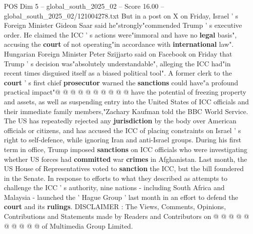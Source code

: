 \begin{textsample}{POS Dim 5 – global\_south\_2025\_02 – Score 16.00 – global\_south\_2025\_02/121004278.txt}
But in a post on X on Friday, Israel ' s Foreign Minister Gideon Saar said he"strongly"commended Trump ' s executive order.
He claimed the ICC ' s actions were"immoral and have no \textbf{legal} basis", accusing the \textbf{court} of not operating"in accordance with \textbf{international} law".
Hungarian Foreign Minister Peter Szijjarto said on Facebook on Friday that Trump ' s decision was"absolutely understandable", alleging the ICC had"in recent times disguised itself as a biased political tool".
A former clerk to the \textbf{court} ' s first chief \textbf{prosecutor} warned the \textbf{sanctions} could have"a profound practical impact"@ @ @ @ @ @ @ @ @ @ have the potential of freezing property and assets, as well as suspending entry into the United States of ICC officials and their immediate family members,"Zachary Kaufman told the BBC World Service.
The US has repeatedly rejected any \textbf{jurisdiction} by the body over American officials or citizens, and has accused the ICC of placing constraints on Israel ' s right to self-defence, while ignoring Iran and anti-Israel groups.
During his first term in office, Trump imposed \textbf{sanctions} on ICC officials who were investigating whether US forces had \textbf{committed} war \textbf{crimes} in Afghanistan.
Last month, the US House of Representatives voted to \textbf{sanction} the ICC, but the bill foundered in the Senate.
In response to efforts to what they described as attempts to challenge the ICC ' s authority, nine nations - including South Africa and Malaysia - launched the ' Hague Group ' last month in an effort to defend the \textbf{court} and its \textbf{rulings}.
DISCLAIMER : The Views, Comments, Opinions, Contributions and Statements made by Readers and Contributors on @ @ @ @ @ @ @ @ @ @ of Multimedia Group Limited.

\end{textsample}
